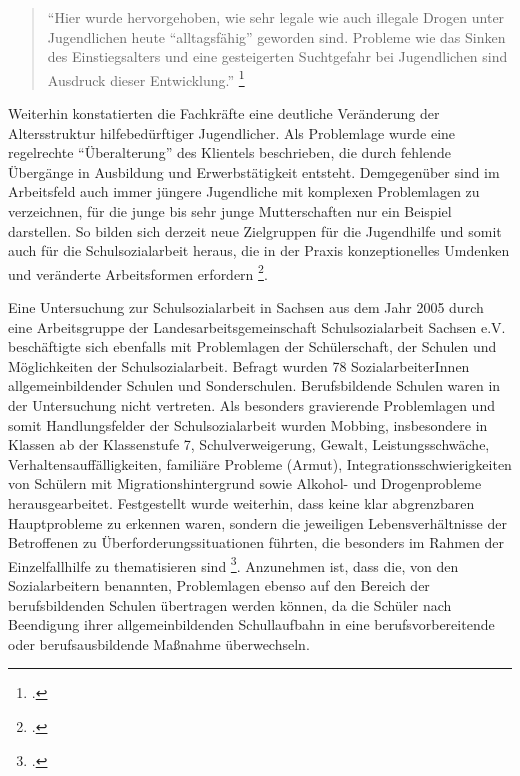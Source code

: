 \begin{quotation}
\noindent
"`Hier wurde hervorgehoben, wie sehr legale wie auch illegale Drogen unter Jugendlichen heute "`alltagsfähig"' geworden sind. Probleme wie das Sinken des Einstiegsalters und eine gesteigerten Suchtgefahr bei Jugendlichen sind Ausdruck dieser Entwicklung."' \footcite[vgl.][142ff]{UniversitaetLeipzig2007}
\end{quotation}

\noindent
Weiterhin konstatierten die Fachkräfte eine deutliche Veränderung der Altersstruktur hilfebedürftiger Jugendlicher. Als Problemlage wurde eine regelrechte "`Überalterung"' des Klientels beschrieben, die durch fehlende Übergänge in Ausbildung und Erwerbstätigkeit entsteht. Demgegenüber sind im Arbeitsfeld auch immer jüngere Jugendliche mit komplexen Problemlagen zu verzeichnen, für die junge bis sehr junge Mutterschaften nur ein Beispiel darstellen. So bilden sich derzeit neue Zielgruppen für die Jugendhilfe und somit auch für die Schulsozialarbeit heraus, die in der Praxis konzeptionelles Umdenken und veränderte Arbeitsformen erfordern \footcite[vgl.][142ff]{UniversitaetLeipzig2007}.
 
Eine Untersuchung zur Schulsozialarbeit in Sachsen aus dem Jahr 2005 durch eine Arbeitsgruppe der Landesarbeitsgemeinschaft Schulsozialarbeit Sachsen e.V. beschäftigte sich ebenfalls mit Problemlagen der Schülerschaft, der Schulen und Möglichkeiten der Schulsozialarbeit. Befragt wurden 78 SozialarbeiterInnen allgemeinbildender Schulen und Sonderschulen. Berufsbildende Schulen waren in der Untersuchung nicht vertreten. Als besonders gravierende Problemlagen und somit Handlungsfelder der Schulsozialarbeit wurden Mobbing, insbesondere in Klassen ab der Klassenstufe 7, Schulverweigerung, Gewalt, Leistungsschwäche, Verhaltensauffälligkeiten, familiäre Probleme (Armut), Integrationsschwierigkeiten von Schülern mit Migrationshintergrund sowie Alkohol- und Drogenprobleme herausgearbeitet. Festgestellt wurde weiterhin, dass keine klar abgrenzbaren Hauptprobleme zu erkennen waren, sondern die jeweiligen Lebensverhältnisse der Betroffenen zu Überforderungssituationen führten, die besonders im Rahmen der Einzelfallhilfe zu thematisieren sind \footcite[vgl.][63ff]{Lang2010}. Anzunehmen ist, dass die, von den Sozialarbeitern benannten, Problemlagen ebenso auf den Bereich der berufsbildenden Schulen übertragen werden können, da die Schüler nach Beendigung ihrer allgemeinbildenden Schullaufbahn in eine berufsvorbereitende oder berufsausbildende Maßnahme überwechseln.

